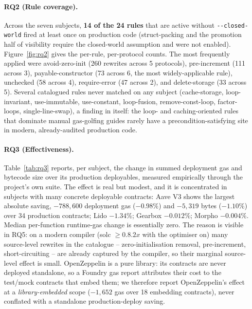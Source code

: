 \paragraph{RQ2 (Rule coverage).}
Across the seven subjects, \textbf{14 of the 24 rules} that are active without
\texttt{-{}-closed-world} fired at least once on production code (struct-packing and the
promotion half of visibility require the closed-world assumption and were not enabled).
Figure~\ref{fig:rq2} gives the per-rule, per-protocol counts. The most frequently applied
were \textsf{avoid-zero-init} (260 rewrites across 5 protocols),
\textsf{pre-increment} (111 across 3), \textsf{payable-constructor} (73 across 6, the most
widely-applicable rule), \textsf{unchecked} (58 across 4), \textsf{require-error} (47
across 2), and \textsf{delete-storage} (33 across 5). Several catalogued rules never matched
on any subject (\textsf{cache-storage}, \textsf{loop-invariant}, \textsf{use-immutable},
\textsf{use-constant}, \textsf{loop-fusion}, \textsf{remove-const-loop},
\textsf{factor-loops}, \textsf{single-line-swap}), a finding in itself: the loop- and
caching-oriented rules that dominate manual gas-golfing guides rarely have a
precondition-satisfying site in modern, already-audited production code.

\paragraph{RQ3 (Effectiveness).}
Table~\ref{tab:rq3} reports, per subject, the change in summed deployment gas and bytecode
size over its production deployables, measured empirically through the project's own suite.
The effect is real but modest, and it is concentrated in subjects with many concrete
deployable contracts: Aave V3 shows the largest absolute saving,
$-788{,}600$ deployment gas ($-0.98\%$) and $-5{,}319$ bytes ($-1.10\%$) over 34 production
contracts; Lido $-1.34\%$; Gearbox $-0.012\%$; Morpho $-0.004\%$. Median per-function
runtime-gas change is essentially zero. The reason is visible in RQ5: on a modern compiler
(solc $\geq0.8.2x$ with the optimiser on) many source-level rewrites in the catalogue --
zero-initialisation removal, pre-increment, short-circuiting -- are already captured by the
compiler, so their marginal source-level effect is small. OpenZeppelin is a pure library:
its contracts are never deployed standalone, so a Foundry gas report attributes their cost
to the test/mock contracts that embed them; we therefore report OpenZeppelin's effect at a
\emph{library-embedded} scope ($-1{,}652$ gas over 18 embedding contracts), never conflated
with a standalone production-deploy saving.

